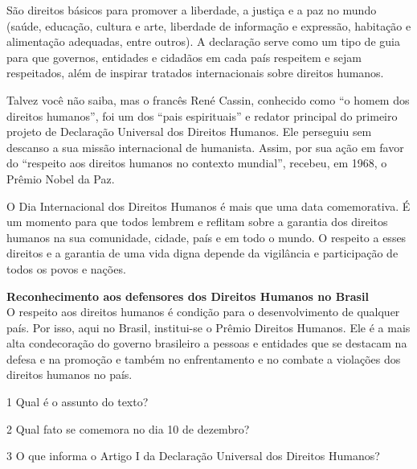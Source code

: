 \begin{conteudo}
\begin{conteudo}
\begin{conteudo}
\begin{conteudo}
\begin{conteudo}
\begin{myquote}
São direitos básicos para promover a liberdade, a justiça e a paz no
mundo (saúde, educação, cultura e arte, liberdade de informação e
expressão, habitação e alimentação adequadas, entre outros). A
declaração serve como um tipo de guia para que governos, entidades e
cidadãos em cada país respeitem e sejam respeitados, além de inspirar
tratados internacionais sobre direitos humanos.

Talvez você não saiba, mas o francês René Cassin, conhecido como ``o
homem dos direitos humanos'', foi um dos ``pais espirituais'' e redator
principal do primeiro projeto de Declaração Universal dos Direitos
Humanos. Ele perseguiu sem descanso a sua missão internacional de
humanista. Assim, por sua ação em favor do ``respeito aos direitos
humanos no contexto mundial'', recebeu, em 1968, o Prêmio Nobel da Paz.

O Dia Internacional dos Direitos Humanos é mais que uma data
comemorativa. É um momento para que todos lembrem e reflitam sobre a
garantia dos direitos humanos na sua comunidade, cidade, país e em todo
o mundo. O respeito a esses direitos e a garantia de uma vida digna
depende da vigilância e participação de todos os povos e nações.

\textbf{Reconhecimento aos defensores dos Direitos Humanos no Brasil}\\
O respeito aos direitos humanos é condição para o desenvolvimento de
qualquer país. Por isso, aqui no Brasil, institui-se o Prêmio Direitos
Humanos. Ele é a mais alta condecoração do governo brasileiro a pessoas
e entidades que se destacam na defesa e na promoção e também no
enfrentamento e no combate a violações dos direitos humanos no país.

\end{myquote}

\num{1} Qual é o assunto do texto?


\num{2} Qual fato se comemora no dia 10 de dezembro?


\num{3} O que informa o Artigo I da Declaração Universal dos Direitos Humanos?


\end{conteudo}
\end{conteudo}
\end{conteudo}
\end{conteudo}
\end{conteudo}
